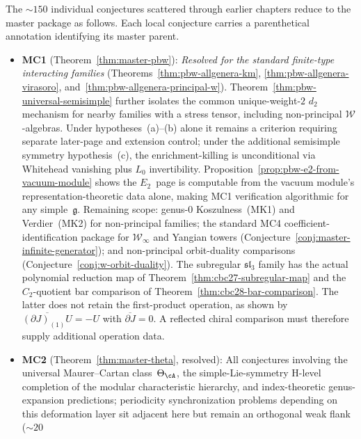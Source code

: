 \begin{remark}\label{rem:conjecture-dependencies}
The ${\sim}150$ individual conjectures scattered through earlier
chapters reduce to the master package as follows.
Each local conjecture carries a parenthetical annotation identifying
its master parent.
\begin{itemize}
\item \textbf{MC1} (Theorem~\ref{thm:master-pbw}):
  \emph{Resolved for the standard finite-type interacting families}
  (Theorems~\ref{thm:pbw-allgenera-km},
  \ref{thm:pbw-allgenera-virasoro},
  and~\ref{thm:pbw-allgenera-principal-w}).
  Theorem~\ref{thm:pbw-universal-semisimple} further isolates the
  common unique-weight-$2$ $d_2$ mechanism for nearby families with a
  stress tensor, including non-principal $\mathcal{W}$-algebras.
  Under hypotheses~(a)--(b) alone it remains a criterion requiring
  separate later-page and extension control; under the additional
  semisimple symmetry hypothesis~(c), the enrichment-killing is
  unconditional via Whitehead vanishing plus $L_0$ invertibility.
  Proposition~\ref{prop:pbw-e2-from-vacuum-module} shows the
  $E_2$~page is computable from the vacuum module's
  representation-theoretic data alone, making MC1 verification
  algorithmic for any simple~$\mathfrak{g}$.
  Remaining scope: genus-$0$ Koszulness~(MK1) and
  Verdier~(MK2) for non-principal families;
  the standard MC4 coefficient-identification package for
  $\mathcal{W}_\infty$ and Yangian towers
  (Conjecture~\ref{conj:master-infinite-generator});
  and non-principal orbit-duality comparisons
  (Conjecture~\ref{conj:w-orbit-duality}).
  The subregular $\mathfrak{sl}_3$ family has the actual polynomial reduction map of
  Theorem~\ref{thm:cbc27-subregular-map} and the $C_2$-quotient bar comparison of
  Theorem~\ref{thm:cbc28-bar-comparison}.
  The latter does not retain the first-product operation, as shown by
  $\overline{(\partial J)_{(1)}U}=-U$ with $\overline{\partial J}=0$.
  A reflected chiral comparison must therefore supply additional operation data.
\item \textbf{MC2} (Theorem~\ref{thm:master-theta}, resolved):
  All conjectures involving the universal Maurer--Cartan class~$\Theta_{\cA}$,
  the simple-Lie-symmetry H-level completion of the modular
  characteristic hierarchy,
  and index-theoretic genus-expansion predictions; periodicity
  synchronization problems depending on this deformation layer sit
  adjacent here but remain an orthogonal weak flank (${\sim}20$

\end{itemize}
\end{remark}
